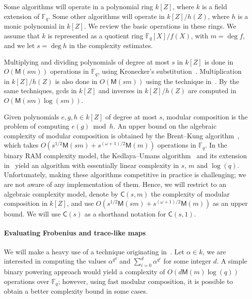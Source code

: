 \documentclass[12pt]{article}
\theoremstyle{plain}
\theoremstyle{definition}
\def\F{\ensuremath{\mathbb{F}}}
\def\MM{\ensuremath{\mathsf{M}}}
\def\CC{\ensuremath{\mathsf{C}}}
\newcounter{algorithm}
\begin{document}
Some algorithms will operate in a polynomial ring $k[Z]$, where $k$ is
a field extension of $\F_q$. Some other algorithms will operate in
$k[Z]/h(Z)$, where $h$ is a monic polynomial in $k[Z]$. We review the
basic operations in these rings. We assume that $k$ is represented as
a quotient ring $\F_q[X]/f(X)$, with $m=\deg f$, and we let $s=\deg h$
in the complexity estimates.

Multiplying and dividing polynomials of degree at most $s$ in $k[Z]$
is done in $O(\MM(sm))$ operations in $\F_q$, using Kronecker's
substitution~\cite{moenck76,kaltofen87,vzGG,vzgathen+shoup92,harvey09}.
Multiplication in $k[Z]/h(Z)$ is also done in $O(\MM(sm))$ using the
technique in~\cite{pascal+schost06}. By the same techniques, gcds in
$k[Z]$ and inverses in $k[Z]/h(Z)$ are computed in $O(\MM(sm)\log(sm))$.

Given polynomials $e,g,h \in k[Z]$ of degree at most $s$, modular
composition is the problem of computing $e(g) \bmod h$. An upper bound
on the algebraic complexity of modular composition is obtained by the
Brent--Kung algorithm~\cite{brent+kung}, which takes
$O(s^{1/2}\MM(sm) + s^{(\omega+1)/2}\MM(m))$ operations in $\F_q$.  In
the binary RAM complexity model, the Kedlaya--Umans
algorithm~\cite{KeUm11} and its extension in~\cite{PoSc13a} yield an
algorithm with essentially linear complexity in $s$, $m$ and
$\log(q)$. Unfortunately, making these algorithms competitive in
practice is challenging; we are not aware of any implementation of
them. Hence, we will restrict to an algebraic complexity model, denote
by $\CC(s,m)$ the complexity of modular composition in $k[Z]$, and use
$O(s^{1/2}\MM(sm) + s^{(\omega+1)/2}\MM(m))$ as an upper bound.  We
will use $\CC(s)$ as a shorthand notation for $\CC(s,1)$.

\paragraph{Evaluating Frobenius and trace-like maps}

We will make a heavy use of a technique originating
in~\cite{von1992computing}. Let $\alpha\in k$, we are interested in
computing the values $\alpha^{q^d}$ and $\sum_{i=0}^d \alpha^{q^i}$
for some integer $d$. A simple binary powering approach would yield a
complexity of $O(d\MM(m)\log(q))$ operations over $\F_q$; however,
using fast modular composition, it is possible to obtain a better
complexity bound in some cases.
\end{document}
